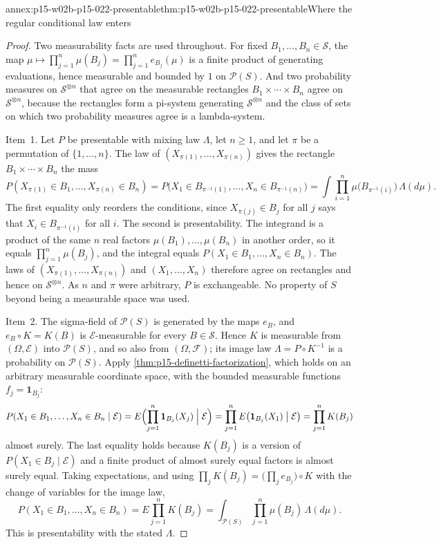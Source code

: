 \begin{annexitem}{annex:p15-w02b-p15-022-presentable}{thm:p15-w02b-p15-022-presentable}{Where the regular conditional law enters}
\begin{proof}
Two measurability facts are used throughout. For fixed
\(B_1,\ldots,B_n\in\mathcal S\), the map
\(\mu\mapsto\prod_{j=1}^n\mu(B_j)=\prod_{j=1}^ne_{B_j}(\mu)\) is a finite
product of generating evaluations, hence measurable and bounded by \(1\)
on \(\mathscr P(S)\). And two probability measures on
\(\mathcal S^{\otimes n}\) that agree on the measurable rectangles
\(B_1\times\cdots\times B_n\) agree on \(\mathcal S^{\otimes n}\), because
the rectangles form a pi-system generating \(\mathcal S^{\otimes n}\) and
the class of sets on which two probability measures agree is a
lambda-system.

Item~1. Let \(P\) be presentable with mixing law \(\Lambda\), let
\(n\geq1\), and let \(\pi\) be a permutation of \(\{1,\ldots,n\}\). The law
of \((X_{\pi(1)},\ldots,X_{\pi(n)})\) gives the rectangle
\(B_1\times\cdots\times B_n\) the mass
\[
 P(X_{\pi(1)}\in B_1,\ldots,X_{\pi(n)}\in B_n)
   =P\bigl(X_1\in B_{\pi^{-1}(1)},\ldots,X_n\in B_{\pi^{-1}(n)}\bigr)
   =\int\prod_{i=1}^n\mu\bigl(B_{\pi^{-1}(i)}\bigr)\,\Lambda(d\mu).
\]
The first equality only reorders the conditions, since
\(X_{\pi(j)}\in B_j\) for all \(j\) says that \(X_i\in B_{\pi^{-1}(i)}\)
for all \(i\). The second is presentability. The integrand is a product
of the same \(n\) real factors \(\mu(B_1),\ldots,\mu(B_n)\) in another
order, so it equals \(\prod_{j=1}^n\mu(B_j)\), and the integral equals
\(P(X_1\in B_1,\ldots,X_n\in B_n)\). The laws of
\((X_{\pi(1)},\ldots,X_{\pi(n)})\) and \((X_1,\ldots,X_n)\) therefore agree
on rectangles and hence on \(\mathcal S^{\otimes n}\). As \(n\) and
\(\pi\) were arbitrary, \(P\) is exchangeable. No property of \(S\) beyond
being a measurable space was used.

Item~2. The sigma-field of \(\mathscr P(S)\) is generated by the maps
\(e_B\), and \(e_B\circ K=K(B)\) is \(\mathcal E\)-measurable for every
\(B\in\mathcal S\). Hence \(K\) is measurable from
\((\Omega,\mathcal E)\) into \(\mathscr P(S)\), and so also from
\((\Omega,\mathcal F)\); its image law \(\Lambda=P\circ K^{-1}\) is a
probability on \(\mathscr P(S)\). Apply
\cref{thm:p15-definetti-factorization}, which holds on an arbitrary
measurable coordinate space, with the bounded measurable functions
\(f_j=\mathbf1_{B_j}\):
\[
 P(X_1\in B_1,\ldots,X_n\in B_n\mid\mathcal E)
   =E\Bigl(\prod_{j=1}^n\mathbf1_{B_j}(X_j)\Bigm|\mathcal E\Bigr)
   =\prod_{j=1}^nE\bigl(\mathbf1_{B_j}(X_1)\bigm|\mathcal E\bigr)
   =\prod_{j=1}^nK(B_j)
\]
almost surely. The last equality holds because \(K(B_j)\) is a version of
\(P(X_1\in B_j\mid\mathcal E)\) and a finite product of almost surely
equal factors is almost surely equal. Taking expectations, and using
\(\prod_jK(B_j)=\bigl(\prod_je_{B_j}\bigr)\circ K\) with the change of
variables for the image law,
\[
 P(X_1\in B_1,\ldots,X_n\in B_n)
   =E\prod_{j=1}^nK(B_j)
   =\int_{\mathscr P(S)}\prod_{j=1}^n\mu(B_j)\,\Lambda(d\mu).
\]
This is presentability with the stated \(\Lambda\).


\end{proof}
\end{annexitem}
